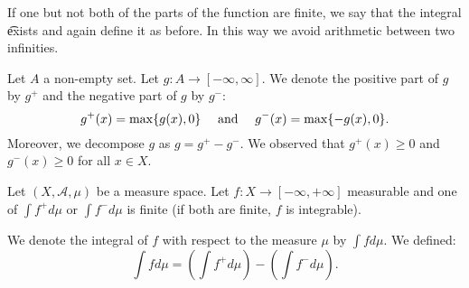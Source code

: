 If one but not both of the parts of the function are finite, we say that the integral \t{exists} and again define it as before.
In this way we avoid arithmetic between two infinities.


Let $A$ a non-empty set.
Let $g: A \to [-\infty, \infty]$.
We denote the positive part
of $g$ by $g^+$ and the negative
part of $g$ by $g^-$:
\[
  g^+(x) = \max\{g(x), 0\} \quad \text{ and } \quad g^-(x) = \max\{-g(x), 0\}.
\]
Moreover, we decompose
$g$
as
$g = g^+ - g^-$.
We observed that
$g^+(x) \geq 0$ and
$g^-(x) \geq 0$
for all $x \in X$.

Let $(X, \mathcal{A}, \mu)$
be a measure space.
Let $f: X \to [-\infty, +\infty]$
measurable and
one of
$\int f^+ d \mu$ or
$\int f^- d \mu$
is finite
(if both are finite,
$f$ is integrable).

We denote the integral
of $f$ with respect to the
measure $\mu$ by
$\int f d \mu$.
We defined:
\[
  \int f d\mu = \left(\int f^+ d\mu\right) - \left(\int f^- d\mu\right).
\]
\strats
